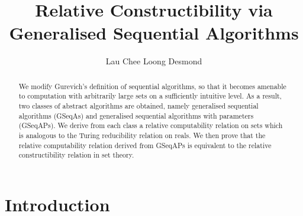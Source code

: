 \documentclass[12pt]{article}
\title{Relative Constructibility via Generalised Sequential Algorithms}
\author{Lau Chee Loong Desmond}
\numberwithin{equation}{section}
\begin{document}
\maketitle

\begin{abstract}
We modify Gurevich's definition of sequential algorithms, so that it becomes amenable to computation with arbitrarily large sets on a sufficiently intuitive level. As a result, two classes of abstract algorithms are obtained, namely generalised sequential algorithms (GSeqAs) and generalised sequential algorithms with parameters (GSeqAPs). We derive from each class a relative computability relation on sets which is analogous to the Turing reducibility relation on reals. We then prove that the relative computability relation derived from GSeqAPs is equivalent to the relative constructibility relation in set theory.
\end{abstract}

\newtheorem{thm}{Theorem}[section]
\newtheorem{innercustomlem}{Lemma}
\newenvironment{customlem}[1]
  {\renewcommand\theinnercustomlem{#1}\innercustomlem}
  {\endinnercustomlem}
\newtheorem{innercustomdef}{Definition}
\newenvironment{customdef}[1]
  {\renewcommand\theinnercustomdef{#1}\innercustomdef}
  {\endinnercustomdef}
\newtheorem{lem}[thm]{Lemma}
\newtheorem{prop}[thm]{Proposition}
\newtheorem{cor}[thm]{Corollary}
\newtheorem{conj}[thm]{Conjecture}
\newtheorem{ques}[thm]{Question}
\newtheorem*{claim}{Claim}
\theoremstyle{definition}
\newtheorem{defi}[thm]{Definition}
\theoremstyle{remark}
\newtheorem*{rem*}{Remark}
\newtheorem{rem}[thm]{Remark}
\newtheorem{ex}[thm]{Example}
\newtheorem{ob}[thm]{Observation}
\newtheorem{fact}[thm]{Fact}
\newtheorem{con}[thm]{Convention}
\newtheorem{diff}[thm]{Difficulty}

\newcommand{\bd}[1]{\mathbf{#1}}  %
\newcommand{\RR}{\mathbb{R}}      %
\newcommand{\ZZ}{\mathbb{Z}}      %
\newcommand{\col}[1]{\left[\begin{matrix} #1 \end{matrix} \right]}
\newcommand{\comb}[2]{\binom{#1^2 + #2^2}{#1+#2}}
\newcommand{\eq}{=}

\newcommand{\blankpage}{
\newpage
\thispagestyle{empty}
\mbox{}
\newpage
}

{\let\clearpage\relax \tableofcontents} 
\thispagestyle{empty}

\section{Introduction}\label{sect1}
\end{document}
